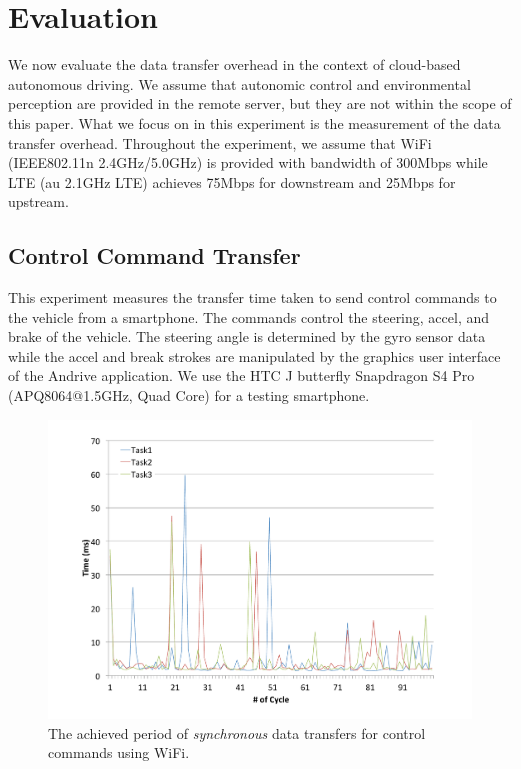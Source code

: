\section{Evaluation}
\label{sec:evaluation}

We now evaluate the data transfer overhead in the context of cloud-based
autonomous driving.
We assume that autonomic control and environmental perception are
provided in the remote server, but they are not within the scope of this
paper.
What we focus on in this experiment is the measurement of the data
transfer overhead.
Throughout the experiment, we assume that WiFi (IEEE802.11n
2.4GHz/5.0GHz) is provided with bandwidth of 300Mbps while LTE (au
2.1GHz LTE) achieves 75Mbps for downstream and 25Mbps for upstream.


\subsection{Control Command Transfer}

This experiment measures the transfer time taken to send control
commands to the vehicle from a smartphone.
The commands control the steering, accel, and brake of the vehicle.
The steering angle is determined by the gyro sensor data while the accel
and break strokes are manipulated by the graphics user interface of the
Andrive application.
We use the HTC J butterfly Snapdragon S4 Pro (APQ8064@1.5GHz, Quad Core)
for a testing smartphone.

\begin{figure}[!t]
 \centering
 \includegraphics[width=0.8\hsize]{fig/No1_Andrive_serv_cycle_WiFi.pdf}
 \caption{The achieved period of \textit{synchronous} data transfers for
 control commands using WiFi.}
 \label{fig:no1}
\end{figure}


